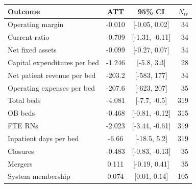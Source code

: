 \begin{tabular}[t]{lccr}
\toprule
Outcome & ATT & 95\% CI & $N_{tr}$ \\
\midrule
Operating margin & -0.010 & [-0.05, 0.02] & 34 \\
Current ratio & -0.709 & [-1.31, -0.11] & 34 \\
Net fixed assets & -0.099 & [-0.27, 0.07] & 34 \\
Capital expenditures per bed & -1.246 & [-5.8, 3.3] & 28 \\
Net patient revenue per bed & -203.2 & [-583, 177] & 34 \\
Operating expenses per bed & -207.6 & [-623, 207] & 35 \\
\addlinespace
Total beds & -4.081 & [-7.7, -0.5] & 319 \\
OB beds & -0.468 & [-0.81, -0.12] & 315 \\
FTE RNs & -2.023 & [-3.44, -0.61] & 319 \\
Inpatient days per bed & -6.66 & [-18.5, 5.2] & 319 \\
\addlinespace
Closures & -0.483 & [-0.83, -0.13] & 35 \\
Mergers & 0.111 & [-0.19, 0.41] & 35 \\
System membership & 0.074 & [0.01, 0.14] & 105 \\
\bottomrule
\end{tabular}
